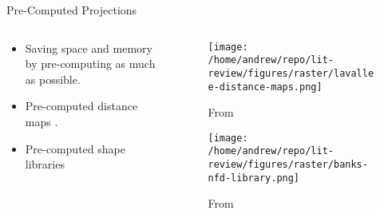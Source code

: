\documentclass[presentation, aspectratio=1610]{beamer}
\begin{document}
\begin{frame}[label={sec:org2dcae06}]{Pre-Computed Projections}
\begin{columns}
\begin{column}{0.5\columnwidth}
\begin{itemize}
\item Saving space and memory by pre-computing as much as possible.
\item Pre-computed distance maps \autocites{zuffiModelbasedMethodReconstruction1999}[][]{lavalleeRecoveringPositionOrientation1995}.
\item Pre-computed shape libraries \autocite{banksAccurateMeasurementThreedimensional1996}
\end{itemize}
\end{column}
\begin{column}{0.6\columnwidth}
\begin{figure}[htbp]
\centering
\texttt{[image: /home/andrew/repo/lit-review/figures/raster/lavallee-distance-maps.png]}
\caption{From \autocite{lavalleeRecoveringPositionOrientation1995}}
\end{figure}
\vspace{-0.25in}
\begin{figure}[htbp]
\centering
\texttt{[image: /home/andrew/repo/lit-review/figures/raster/banks-nfd-library.png]}
\caption{From \autocite{banksAccurateMeasurementThreedimensional1996}}
\end{figure}
\end{column}
\end{columns}
\end{frame}
\end{document}

